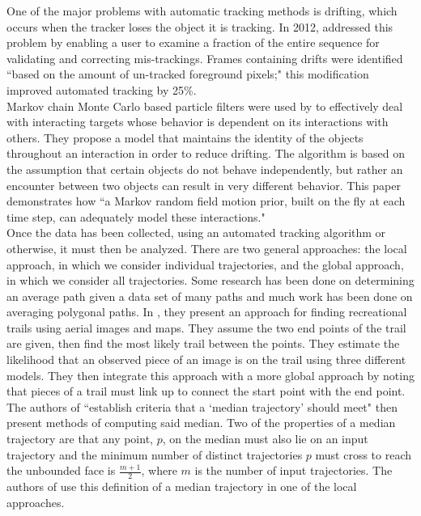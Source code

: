 \documentclass[12pt]{article}
\begin{document}
\indent One of the major problems with automatic tracking methods is drifting, which occurs when the tracker loses the object it is tracking. In 2012, \cite{Poff12} addressed this problem by enabling a user to examine a fraction of the entire sequence for validating and correcting mis-trackings. Frames containing drifts were identified ``based on the amount of un-tracked foreground pixels;" this modification improved automated tracking by 25\%.\\
\indent Markov chain Monte Carlo based particle filters were used by \cite{Zuria08} to effectively deal with interacting targets whose behavior is dependent on its interactions with others. They propose a model that maintains the identity of the objects throughout an interaction in order to reduce drifting. The algorithm is based on the assumption that certain objects do not behave independently, but rather an encounter between two objects can result in very different behavior. This paper demonstrates how ``a Markov random field motion prior, built on the fly at each time step, can adequately model these interactions."\\
\indent Once the data has been collected, using an automated tracking algorithm or otherwise, it must then be analyzed. There are two general approaches: the local approach, in which we consider individual trajectories, and the global approach, in which we consider all trajectories. Some research has been done on determining an average path given a data set of many paths and much work has been done on averaging polygonal paths. In \cite{Morris}, they present an approach for finding recreational trails using aerial images and maps. They assume the two end points of the trail are given, then find the most likely trail between the points. They estimate the likelihood that an observed piece of an image is on the trail using three different models. They then integrate this approach with a more global approach by noting that pieces of a trail must link up to connect the start point with the end point. \\
\indent The authors of \cite{Buchin10} ``establish criteria that a `median trajectory' should meet" then present methods of computing said median. Two of the properties of a median trajectory are that any point, $p$, on the median must also lie on an input trajectory and the minimum number of distinct trajectories $p$ must cross to reach the unbounded face is $\frac{m+1}{2}$, where $m$ is the number of input trajectories. The authors of \cite{Joy12} use this definition of a median trajectory in one of the local approaches.\\
\end{document}
